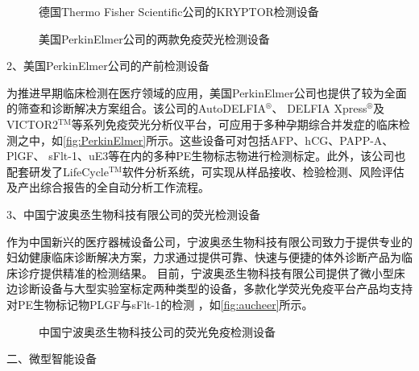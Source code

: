 \begin{figure}[htbp]
    \centering
    \quad
    \caption{\label{fig:B·R·A·H·M·S}德国Thermo Fisher Scientific公司的KRYPTOR检测设备}
\end{figure}
\vspace{1cm}
\begin{figure}[htbp]
    \centering
    \quad
    \caption{\label{fig:PerkinElmer}美国PerkinElmer公司的两款免疫荧光检测设备}
\end{figure}
\vspace{1cm}

2、美国PerkinElmer公司的产前检测设备

为推进早期临床检测在医疗领域的应用，美国PerkinElmer公司也提供了较为全面的筛查和诊断解决方案组合\cite{perkinelmer2023}。该公司的AutoDELFIA$^\circledR$、
DELFIA Xpress$^\circledR$及VICTOR2$^\text{TM}$等系列免疫荧光分析仪平台，可应用于多种孕期综合并发症的临床检测之中，如\autoref{fig:PerkinElmer}所示。这些设备可对包括AFP、hCG、PAPP-A、PlGF、
sFlt-1、uE3等在内的多种PE生物标志物进行检测标定。此外，该公司也配套研发了LifeCycle$^\text{TM}$软件分析系统，可实现从样品接收、检验检测、风险评估及产出综合报告的全自动分析工作流程。

3、中国宁波奥丞生物科技有限公司的荧光检测设备

作为中国新兴的医疗器械设备公司，宁波奥丞生物科技有限公司致力于提供专业的妇幼健康临床诊断解决方案，力求通过提供可靠、快速与便捷的体外诊断产品为临床诊疗提供精准的检测结果。
目前，宁波奥丞生物科技有限公司提供了微小型床边诊断设备与大型实验室标定两种类型的设备，多款化学荧光免疫平台产品均支持对PE生物标记物PLGF与sFlt-1的检测
，如\autoref{fig:aucheer}所示\cite{aucheer2023}。
\begin{figure}[h]
    \centering
    \quad
    \caption{\label{fig:aucheer}中国宁波奥丞生物科技公司的荧光免疫检测设备}
\end{figure}

二、微型智能设备

